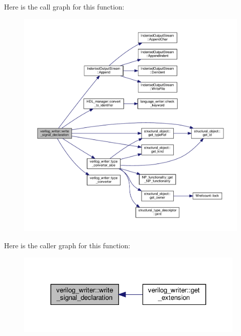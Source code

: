Here is the call graph for this function\+:
\nopagebreak
\begin{figure}[H]
\begin{center}
\leavevmode
\includegraphics[width=350pt]{d8/dba/classverilog__writer_ad10d67870682d947144dac0629560742_cgraph}
\end{center}
\end{figure}
Here is the caller graph for this function\+:
\nopagebreak
\begin{figure}[H]
\begin{center}
\leavevmode
\includegraphics[width=311pt]{d8/dba/classverilog__writer_ad10d67870682d947144dac0629560742_icgraph}
\end{center}
\end{figure}
\mbox{\label{classverilog__writer_a97913d24c2a3524e21363688c90f3eb0}} 
